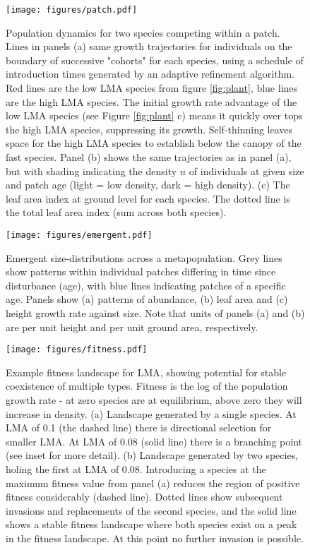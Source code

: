 \documentclass[a4paper,11pt]{article}
\begin{document}
\newpage

\begin{figure}[h!]
\centering
\texttt{[image: figures/patch.pdf]}
\caption{Population dynamics for two species competing within a patch. Lines
in panels (a) same growth trajectories for individuals on the
boundary of successive "cohorts" for each species, using a schedule of 
introduction times generated by an adaptive refinement algorithm.
 Red lines are the low LMA
species from figure \ref{fig:plant}, blue lines are the high LMA species.  The
initial growth rate advantage of the low LMA species (see Figure
\ref{fig:plant} c) means it quickly over tops the high LMA species,
suppressing its growth.  Self-thinning leaves space for the high LMA species
to establish below the canopy of the fast species. Panel (b) shows the same
trajectories as in panel (a), but with shading indicating the density $n$ of
individuals at given size and patch age (light = low density, dark = high density).  
(c) The leaf area index at ground
level for each species.  The dotted line is the total leaf area index (sum
across both species).}
\label{fig:patch}
\end{figure}

\newpage

\begin{figure}[h!]
\centering
\texttt{[image: figures/emergent.pdf]}
\caption{Emergent size-distributions across a metapopulation.
Grey lines show patterns within individual patches differing in time since disturbance (age), with blue lines indicating patches of a specific age. Panels show (a) patterns of abundance, (b) leaf area and (c) height growth rate against size. Note that units of panels (a) and (b) are per unit height and per unit ground area, respectively.}
\label{fig:emergent}
\end{figure}

\newpage

\begin{figure}[h!]
\centering
\texttt{[image: figures/fitness.pdf]}
\caption{Example fitness landscape for LMA, showing potential for stable
coexistence of multiple types.  Fitness is the log of the population growth
rate - at zero species are at equilibrium, above zero they will increase in
density.  (a) Landscape generated by a single species.  At LMA of 0.1 (the
dashed line) there is directional selection for smaller LMA.  At LMA of 0.08
(solid line) there is a branching point (see inset for more detail).  (b)
Landscape generated by two species, holing the first at LMA of 0.08.
Introducing a species at the maximum fitness value from panel (a) reduces the
region of positive fitness considerably (dashed line).  Dotted lines show
subsequent invasions and replacements of the second species, and the solid
line shows a stable fitness landscape where both species exist on a peak in
the fitness landscape.  At this point no further invasion is possible.}
\label{fig:fitness}
\end{figure}
\end{document}
